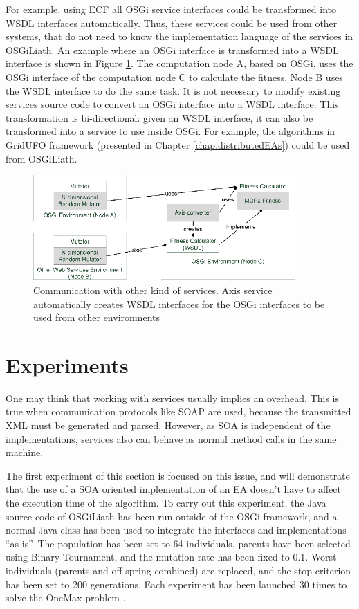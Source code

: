 For example, using ECF all OSGi service interfaces could be transformed into WSDL interfaces automatically. Thus, these services could be used from other systems, that do not need to know the implementation language of the services in OSGiLiath. An example where an OSGi interface is transformed into a WSDL interface is shown in Figure \ref{AXISFIGURE}. The computation node A, based on OSGi, uses the OSGi interface of the computation node C to calculate the fitness. Node B uses the WSDL interface to do the same task. It is not necessary to modify existing services source code to convert an OSGi interface into a WSDL interface. This transformation is bi-directional: given an WSDL interface, it can also be transformed into a service to use inside OSGi. For example, the algorithms in GridUFO framework (presented in Chapter \ref{chap:distributedEAs}) could be used from OSGiLiath.






\begin{figure}
\centering
\includegraphics[width=10cm]{gfx/osgiliath/axis.png}


\caption{Communication with other kind of services. Axis service automatically creates WSDL interfaces for the OSGi interfaces to be used from other environments}
\label{AXISFIGURE}
\end{figure}

\section{Experiments}
One may think that working with services usually implies an overhead. This is true when communication protocols like SOAP are used, because the transmitted XML must be generated and parsed. However, as SOA is independent of the implementations, services also can behave as normal method calls in the same machine.


The first experiment of this section is focused on this issue, and will demonstrate that the use of a SOA oriented implementation of an EA doesn't have to affect the execution time of the algorithm. To carry out this experiment, the Java source code of OSGiLiath has been run outside of the OSGi framework, and a normal Java class has been used to integrate the interfaces and implementations ``as is''. The population has been set to 64 individuals, parents have been selected using Binary Tournament, and the mutation rate has been fixed to 0.1. Worst individuals (parents and off-spring combined) are replaced, and the stop criterion has been set to 200 generations. Each experiment has been launched 30 times to solve the OneMax problem \cite{SchafferOnemax91}.



